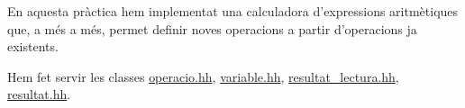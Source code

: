En aquesta pràctica hem implementat una calculadora d’expressions aritmètiques que, a més a més, permet definir noves operacions a partir d’operacions ja existents.

Hem fet servir les classes \hyperlink{operacio_8hh}{operacio.\+hh}, \hyperlink{variable_8hh}{variable.\+hh}, \hyperlink{resultat__lectura_8hh}{resultat\+\_\+lectura.\+hh}, \hyperlink{resultat_8hh}{resultat.\+hh}. 